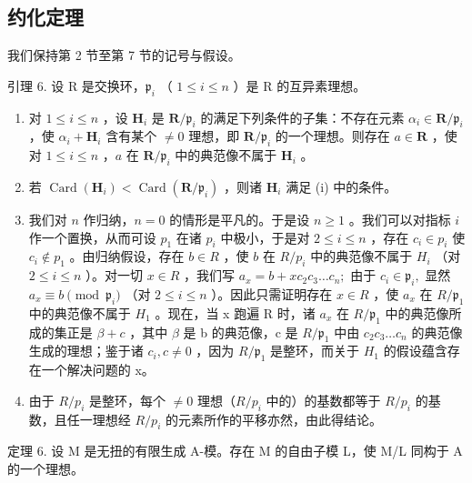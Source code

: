 \subsection{约化定理}

我们保持第 2 节至第 7 节的记号与假设。

引理 6. 设 R 是交换环，\(\mathfrak{p}_i\) （ \(1 \leqslant i \leqslant n\) ）是 R 的互异素理想。

\begin{enumerate}
\def\labelenumi{(\roman{enumi})}
\item
  对 \(1 \leqslant i \leqslant n\) ，设 \(\mathbf{H}_i\) 是 \(\mathbf{R} / \mathfrak{p}_i\) 的满足下列条件的子集：不存在元素 \(\alpha_i \in \mathbf{R} / \mathfrak{p}_i\) ，使 \(\alpha_i + \mathbf{H}_i\) 含有某个 \(\neq 0\) 理想，即 \(\mathbf{R} / \mathfrak{p}_i\) 的一个理想。则存在 \(a \in \mathbf{R}\) ，使对 \(1 \leqslant i \leqslant n\) ，\(a\) 在 \(\mathbf{R} / \mathfrak{p}_i\) 中的典范像不属于 \(\mathbf{H}_i\) 。
\item
  若 \(\operatorname{Card}(\mathbf{H}_i) < \operatorname{Card}(\mathbf{R} / \mathfrak{p}_i)\) ，则诸 \(\mathbf{H}_i\) 满足 (i) 中的条件。
\item
  我们对 \(n\) 作归纳，\(n = 0\) 的情形是平凡的。于是设 \(n \geqslant 1\) 。我们可以对指标 \(i\) 作一个置换，从而可设 \(p_1\) 在诸 \(p_i\) 中极小，于是对 \(2 \leqslant i \leqslant n\) ，存在 \(c_i \in p_i\) 使 \(c_i \notin p_1\) 。由归纳假设，存在 \(b \in R\) ，使 \(b\) 在 \(R / p_i\) 中的典范像不属于 \(H_i\) （对 \(2 \leqslant i \leqslant n\) ）。对一切 \(x \in R\) ，我们写 \(a_{x}=b+xc_{2}c_{3}\ldots c_{n};\) 由于 \(c_{i}\in\mathfrak{p}_{i},\) 显然 \(a_{x}\equiv b\pmod{\mathfrak{p}_{i}}\) （对 \(2\leqslant i\leqslant n\) ）。因此只需证明存在 \(x\in R\) ，使 \(a_{x}\) 在 \(R/\mathfrak{p}_{1}\) 中的典范像不属于 \(H_{1}\) 。现在，当 x 跑遍 R 时，诸 \(a_{x}\) 在 \(R/\mathfrak{p}_{1}\) 中的典范像所成的集正是 \(\beta+c\) ，其中 \(\beta\) 是 b 的典范像，c 是 \(R/\mathfrak{p}_{1}\) 中由 \(c_{2}c_{3}\ldots c_{n}\) 的典范像生成的理想；鉴于诸 \(c_{i},c\neq0\) ，因为 \(R/\mathfrak{p}_{1}\) 是整环，而关于 \(H_{1}\) 的假设蕴含存在一个解决问题的 x。
\item
  由于 \(R/p_{i}\) 是整环，每个 \(\neq0\) 理想（\(R/p_{i}\) 中的）的基数都等于 \(R/p_{i}\) 的基数，且任一理想经 \(R/p_{i}\) 的元素所作的平移亦然，由此得结论。
\end{enumerate}

定理 6. 设 M 是无扭的有限生成 A-模。存在 M 的自由子模 L，使 M/L 同构于 A 的一个理想。

